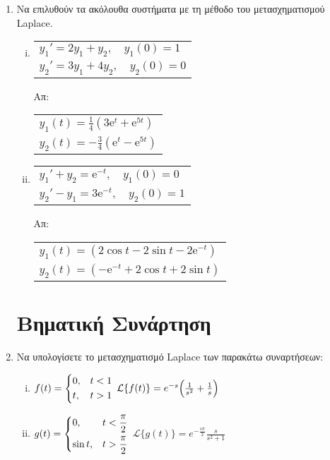 \begin{enumerate}
  \item Να επιλυθούν τα ακόλουθα συστήματα με τη μέθοδο του μετασχηματισμού Laplace.
    \begin{enumerate}[i)]
      \item 
        \begin{tabular}{l}
          $ y_{1}'=2 y_{1}+ y_{2}, \quad y_{1}(0)=1 $ \\
          $ y_{2}'= 3 y_{1}+ 4 y_{2}, \quad y_{2}(0)= 0 $ 
        \end{tabular} \hfill Απ: 
        \begin{tabular}{l}
          $ y_{1}(t) = \frac{1}{4} \left(3 \mathrm{e}^{t} + \mathrm{e}^{5t}\right) $ \\
          $ y_{2}(t) = -\frac{3}{4} \left( \mathrm{e}^{t} -  \mathrm{e}^{5t}\right) $ 
        \end{tabular}
      \item 
        \begin{tabular}{l}
          $ y_{1}'+ y_{2} = \mathrm{e}^{-t}, \quad y_{1}(0)=0 $ \\
          $ y_{2}' - y_{1} =3\mathrm{e}^{-t}, \quad y_{2}(0)=1 $
        \end{tabular} \hfill Απ: 
        \begin{tabular}{l}
          $ y_{1}(t) = (2 \cos{t} - 2 \sin{t} -2 \mathrm{e}^{-t}) $ \\
          $ y_{2}(t) = ( - \mathrm{e}^{-t} + 2 \cos{t} + 2 \sin{t}) $
        \end{tabular}
    \end{enumerate}


    \section*{Βηματική Συνάρτηση}

  \item Να υπολογίσετε το μετασχηματισμό Laplace των παρακάτω συναρτήσεων:
    \begin{enumerate}[i)]
      \item $f(t)=
        \begin{dcases} 
          0, & t<1 \\ t, & t>1 
        \end{dcases}$ 
        \hfill $\mathcal{L}\{f(t)\}=e^{-s}\Bigl(\frac{1}{s^2}+\frac{1}{s}\Bigr)$
      \item $g(t)=
        \begin{dcases} 
          0, & t<\frac{\pi}{2} \\ \sin t, & t>\frac{\pi}{2} 
        \end{dcases}$ 
        \hfill $\mathcal{L}\{g(t)\}=e^{-\frac{s\pi}{2}}\frac{s}{s^2+1}$
    \end{enumerate}


\end{enumerate}
